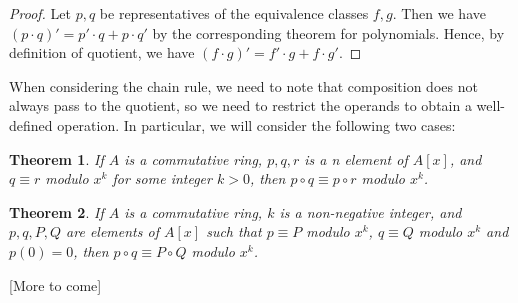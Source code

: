 \documentclass[12pt]{article}
\newtheorem{thm}{Theorem}
\begin{document}
\begin{proof}
Let $p,q$ be representatives of the equivalence classes
$f,g$.  Then we have $(p \cdot q)' = p' \cdot q + p \cdot q'$ 
by the corresponding theorem for polynomials.  Hence, by 
definition of quotient, we have 
$(f \cdot g)' = f' \cdot g + f \cdot g'$.
\end{proof}

When considering the chain rule, we need to note that composition
does not always pass to the quotient, so we need to restrict the
operands to obtain a well-defined operation.  In particular, we
will consider the following two cases:

\begin{thm}
If $A$ is a commutative ring, $p,q,r$ is a n element of $A[x]$,
and $q \equiv r$ modulo $x^k$ for some integer $k > 0$, then
$p \circ q \equiv p \circ r$ modulo $x^k$.
\end{thm}

\begin{thm}
If $A$ is a commutative ring, $k$ is a non-negative integer, and
$p,q,P,Q$ are elements of $A[x]$ such that $p \equiv P$ modulo 
$x^k$, $q \equiv Q$ modulo $x^k$ and $p(0) = 0$, then $p \circ q
\equiv P \circ Q$ modulo $x^k$.
\end{thm}

[More to come]
\end{document}
